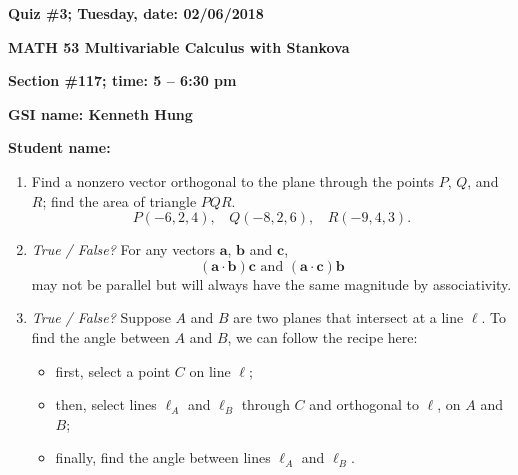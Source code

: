 \documentclass{article}
\begin{document}
{\bf Quiz \#3; Tuesday, date: 02/06/2018}

{\bf MATH 53 Multivariable Calculus with Stankova}

{\bf Section \#117; time: 5 -- 6:30 pm}

{\bf GSI name: Kenneth Hung}

{\bf Student name:}

\vspace*{0.25in}

\begin{enumerate}
\item Find a nonzero vector orthogonal to the plane through the points $P$, $Q$, and $R$; find the area of triangle $PQR$.
\[
P(-6, 2, 4), ~~~~ Q(-8, 2, 6), ~~~~ R(-9, 4, 3).
\]

\item {\em True / False?} For any vectors $\mathbf{a}$, $\mathbf{b}$ and $\mathbf{c}$,
\[
(\mathbf{a} \cdot \mathbf{b}) \mathbf{c} \text{ and } (\mathbf{a} \cdot \mathbf{c}) \mathbf{b}
\]
may not be parallel but will always have the same magnitude by associativity.

\item {\em True / False?} Suppose $A$ and $B$ are two planes that intersect at a line $\ell$. To find the angle between $A$ and $B$, we can follow the recipe here:
\begin{itemize}
\item first, select a point $C$ on line $\ell$;
\item then, select lines $\ell_A$ and $\ell_B$ through $C$ and orthogonal to $\ell$, on $A$ and $B$;
\item finally, find the angle between lines $\ell_A$ and $\ell_B$.
\end{itemize}
\end{enumerate}
\end{document}
